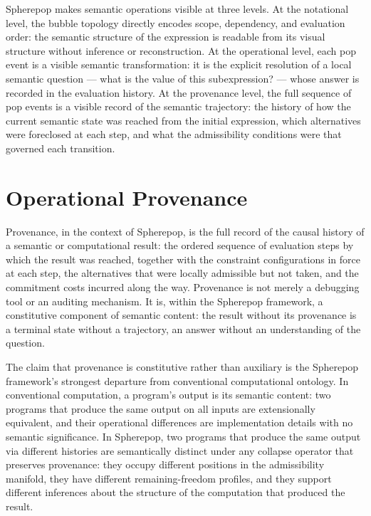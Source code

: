\documentclass[12pt,openany]{book}
\theoremstyle{plain}
\theoremstyle{definition}
\theoremstyle{remark}
\begin{document}
Spherepop makes semantic operations visible at three levels. At the notational level, the bubble topology directly encodes scope, dependency, and evaluation order: the semantic structure of the expression is readable from its visual structure without inference or reconstruction. At the operational level, each pop event is a visible semantic transformation: it is the explicit resolution of a local semantic question — what is the value of this subexpression? — whose answer is recorded in the evaluation history. At the provenance level, the full sequence of pop events is a visible record of the semantic trajectory: the history of how the current semantic state was reached from the initial expression, which alternatives were foreclosed at each step, and what the admissibility conditions were that governed each transition.

\section{Operational Provenance}

Provenance, in the context of Spherepop, is the full record of the causal history of a semantic or computational result: the ordered sequence of evaluation steps by which the result was reached, together with the constraint configurations in force at each step, the alternatives that were locally admissible but not taken, and the commitment costs incurred along the way. Provenance is not merely a debugging tool or an auditing mechanism. It is, within the Spherepop framework, a constitutive component of semantic content: the result without its provenance is a terminal state without a trajectory, an answer without an understanding of the question.

The claim that provenance is constitutive rather than auxiliary is the Spherepop framework's strongest departure from conventional computational ontology. In conventional computation, a program's output is its semantic content: two programs that produce the same output on all inputs are extensionally equivalent, and their operational differences are implementation details with no semantic significance. In Spherepop, two programs that produce the same output via different histories are semantically distinct under any collapse operator that preserves provenance: they occupy different positions in the admissibility manifold, they have different remaining-freedom profiles, and they support different inferences about the structure of the computation that produced the result.
\end{document}
